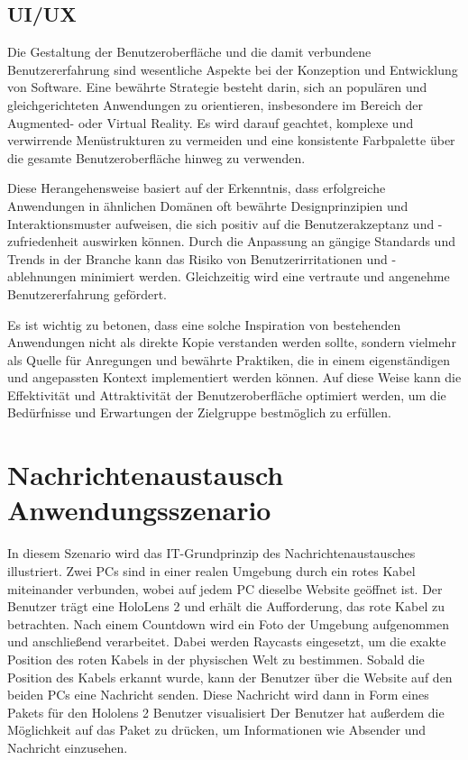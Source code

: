\subsection{UI/UX}
Die Gestaltung der Benutzeroberfläche und die damit verbundene Benutzererfahrung sind wesentliche Aspekte bei der Konzeption und Entwicklung von Software. Eine bewährte Strategie besteht darin, sich an populären und gleichgerichteten Anwendungen zu orientieren, insbesondere im Bereich der Augmented- oder Virtual Reality. Es wird darauf geachtet, komplexe und verwirrende Menüstrukturen zu vermeiden und eine konsistente Farbpalette über die gesamte Benutzeroberfläche hinweg zu verwenden.

Diese Herangehensweise basiert auf der Erkenntnis, dass erfolgreiche Anwendungen in ähnlichen Domänen oft bewährte Designprinzipien und Interaktionsmuster aufweisen, die sich positiv auf die Benutzerakzeptanz und -zufriedenheit auswirken können. Durch die Anpassung an gängige Standards und Trends in der Branche kann das Risiko von Benutzerirritationen und -ablehnungen minimiert werden. Gleichzeitig wird eine vertraute und angenehme Benutzererfahrung gefördert.

Es ist wichtig zu betonen, dass eine solche Inspiration von bestehenden Anwendungen nicht als direkte Kopie verstanden werden sollte, sondern vielmehr als Quelle für Anregungen und bewährte Praktiken, die in einem eigenständigen und angepassten Kontext implementiert werden können. Auf diese Weise kann die Effektivität und Attraktivität der Benutzeroberfläche optimiert werden, um die Bedürfnisse und Erwartungen der Zielgruppe bestmöglich zu erfüllen.





\section{\label{sec:jonasSzenario}Nachrichtenaustausch Anwendungsszenario} 
In diesem Szenario wird das IT-Grundprinzip des Nachrichtenaustausches illustriert. Zwei PCs sind in einer realen Umgebung durch ein rotes Kabel miteinander verbunden, wobei auf jedem PC dieselbe Website geöffnet ist. Der Benutzer trägt eine HoloLens 2 und erhält die Aufforderung, das rote Kabel zu betrachten. Nach einem Countdown wird ein Foto der Umgebung aufgenommen und anschließend verarbeitet. Dabei werden Raycasts eingesetzt, um die exakte Position des roten Kabels in der physischen Welt zu bestimmen. Sobald die Position des Kabels erkannt wurde, kann der Benutzer über die Website auf den beiden PCs eine Nachricht senden. Diese Nachricht wird dann in Form eines Pakets für den Hololens 2 Benutzer visualisiert
Der Benutzer hat außerdem die Möglichkeit auf das Paket zu drücken, um Informationen wie Absender und Nachricht einzusehen.

